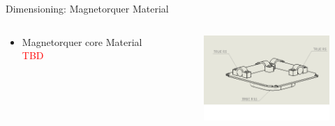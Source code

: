 \documentclass{beamer}
\begin{document}
\begin{frame}{Dimensioning: Magnetorquer Material}
    
     \begin{columns}[t]
        \begin{column}[t]{0.5\textwidth}
            \begin{itemize}
                \item Magnetorquer core Material \textcolor{red}{TBD}

            \end{itemize}
        \end{column}
        \begin{column}[t]{0.5\textwidth}
            \begin{figure}[!ht]
                \begin{center}
                    \includegraphics[width=5cm]{figures/desenho adcs.png}
                \end{center}
            \end{figure}
        \end{column}
    \end{columns}

\end{frame}
\end{document}
